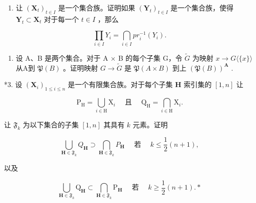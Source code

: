 \exercisegroup

\begin{enumerate}
\def\labelenumi{\arabic{enumi}.}
\tightlist
\item
  让 \((\mathbf{X}_t)_{t \in I}\) 是一个集合族。证明如果 \((\mathbf{Y}_t)_{t \in I}\) 是一个集合族，使得 \(\mathbf{Y}_t \subset \mathbf{X}_t\) 对于每一个 \(t \in I\) ，那么
\end{enumerate}

\[
\prod_ {i \in I} Y _ {i} = \bigcap_ {i \in I} p r _ {i} ^ {- 1} (Y _ {i}).
\]

\begin{enumerate}
\def\labelenumi{\arabic{enumi}.}
\setcounter{enumi}{1}
\tightlist
\item
  设 A、B 是两个集合。对于 A × B 的每个子集 G，令 \(\tilde{G}\) 为映射 \(x \to G\langle\{x\}\rangle\) 从A到 \(\mathfrak{P}(B)\) 。证明映射 \(G \to \tilde{G}\) 是 \(\mathfrak{P}(A \times B)\) 到上 \((\mathfrak{P}(B))^{\mathbf{A}}\) .
\end{enumerate}

*3. 设 \((\mathbf{X}_i)_{1\leqslant i\leqslant n}\) 是一个有限集合族。对于每个子集 \(\mathbf{H}\) 索引集的 \([1,n]\) 让

\[
\mathrm{P} _ {\mathrm{H}} = \bigcup_ {i \in \mathrm{H}} \mathrm{X} _ {i} \quad \text { 且 } \quad \mathrm{Q} _ {\mathrm{H}} = \bigcap_ {i \in \mathrm{H}} \mathrm{X} _ {i}.
\]

让 \(\mathfrak{F}_k\) 为以下集合的子集 \([1, n]\) 其具有 \(k\) 元素。证明

\[
\bigcup_ {\mathbf {H} \in \mathfrak {F} _ {k}} Q _ {\mathbf {H}} \supset \bigcap_ {\mathbf {H} \in \mathfrak {F} _ {k}} P _ {\mathbf {H}} \quad \text { 若 } \quad k \leqslant \frac {1}{2} (n + 1),
\]

以及

\[
\bigcup_ {\mathbf {H} \in \mathfrak {F} _ {k}} \mathrm{Q} _ {\mathbf {H}} \subset \bigcap_ {\mathbf {H} \in \mathfrak {F} _ {k}} \mathrm{P} _ {\mathbf {H}} \quad \text { 若 } \quad k \geqslant \frac {1}{2} (n + 1). *
\]

